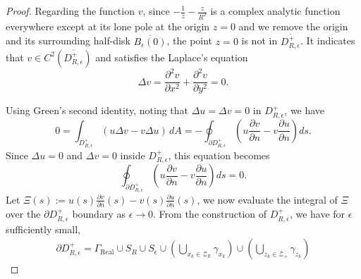 \documentclass[11pt,twoside]{article} %
\begin{document}
\begin{proof}
Regarding the function $v$, since $-\frac{1}{z} - \frac{z}{R^2}$ is a complex analytic function everywhere except at its lone pole at the origin $z = 0$ and we remove the origin and its surrounding half-disk $\overline{B_\epsilon(0)}$, the point $z = 0$ is not in $\overline{D_{R,\epsilon}^+}$. It indicates that $v \in C^2(\overline{D_{R,\epsilon}^+})$ and satisfies the Laplace's equation
$$\Delta v = \frac{\partial^2 v}{\partial x^2} + \frac{\partial^2 v}{\partial y^2} = 0.$$

Using Green's second identity, noting that $\Delta u = \Delta v = 0$ in $D^{+}_{R,\epsilon}$, we have 
$$0 = \int_{D_{R,\epsilon}^+} (u \Delta v - v \Delta u) \, dA = -\oint_{\partial D_{R,\epsilon}^+} \left( u \frac{\partial v}{\partial n} - v \frac{\partial u}{\partial n} \right) ds.$$
Since $\Delta u = 0$ and $\Delta v = 0$ inside $D_{R,\epsilon}^+$, this equation becomes
$$ \oint_{\partial D_{R,\epsilon}^+} \left( u \frac{\partial v}{\partial n} - v \frac{\partial u}{\partial n} \right) ds = 0.$$
Let $\Xi(s) := u(s)\frac{\partial v}{\partial n}(s) - v(s) \frac{\partial u}{\partial n}(s)$, we now evaluate the integral of $\Xi$ over the $\partial D_{R,\epsilon}^+$ boundary as $\epsilon \to 0$. From the construction of $D_{R,\epsilon}^+$, we have for $\epsilon$ sufficiently small,
\begin{align}
\partial D_{R,\epsilon}^+ = \Gamma_{\text{Real}} \cup S_R \cup S_\epsilon \cup \left( \bigcup_{x_k \in \mathcal{Z}_{\mathbb{R}}} \gamma_{x_k} \right) \cup \left( \bigcup_{z_k \in \mathcal{Z}_{+}} \gamma_{z_k} \right) \label{eq:logarithmic_bound_1}

\end{align}
\end{proof}
\end{document}
